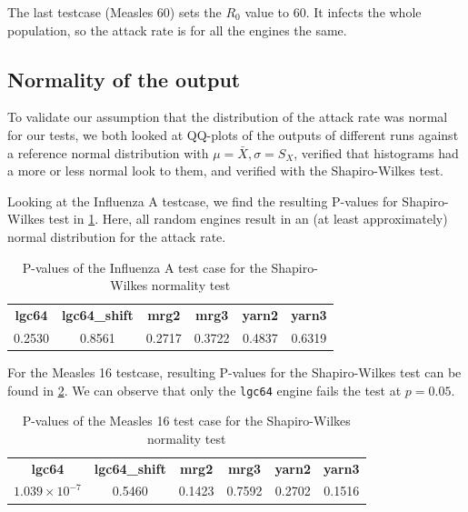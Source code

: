 \documentclass{acmart}
\begin{document}
The last testcase (Measles 60) sets the $R_0$ value to 60. It infects the whole population, so the attack rate is for all the engines the same.
    
\subsection{Normality of the output}
\label{par:normality}
To validate our assumption that the distribution of the attack rate was normal for our tests, we both looked at QQ-plots of the outputs of different runs against a reference normal distribution with $\mu = \bar{X}, \sigma=S_X$, verified that histograms had a more or less normal look to them, and verified with the Shapiro-Wilkes test.

Looking at the Influenza A testcase, we find the resulting P-values for Shapiro-Wilkes test in \cref{tab:influenza_a:shapiro}. Here, all random engines result in an (at least approximately) normal distribution for the attack rate.
\begin{table}[!hbt]
    \begin{tabular}{c c c c c c}
       \textbf{lgc64} & \textbf{lgc64\_shift} & \textbf{mrg2} & \textbf{mrg3} & \textbf{yarn2} & \textbf{yarn3}\\
        0.2530 & 0.8561 & 0.2717 & 0.3722 & 0.4837 & 0.6319
    \end{tabular}
    \caption{P-values of the Influenza A test case for the Shapiro-Wilkes normality test}
    \label{tab:influenza_a:shapiro}
\end{table}


For the Measles 16 testcase, resulting P-values for the Shapiro-Wilkes test can be found in \cref{tab:measles_16:shapiro}.
We can observe that only the \texttt{lgc64} engine fails the test at $p = 0.05$. %

\begin{table}[!hbt]
    \begin{tabular}{c c c c c c}
       \textbf{lgc64} & \textbf{lgc64\_shift} & \textbf{mrg2} & \textbf{mrg3} & \textbf{yarn2} & \textbf{yarn3}\\
        $1.039\times10^{-7}$ & 0.5460 & 0.1423 & 0.7592 & 0.2702 & 0.1516
    \end{tabular}
    \caption{P-values of the Measles 16 test case for the Shapiro-Wilkes normality test}
    \label{tab:measles_16:shapiro}
\end{table}
\end{document}
